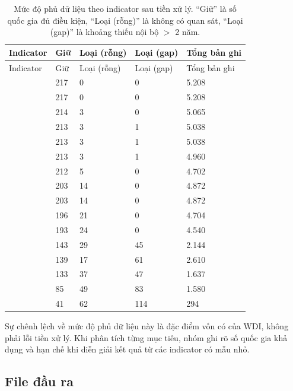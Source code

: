 \begin{longtable}{L{3.5cm}L{2.5cm}L{2cm}L{2cm}L{2.2cm}}
\caption{Mức độ phủ dữ liệu theo indicator sau tiền xử lý. ``Giữ'' là số quốc gia đủ điều kiện, ``Loại (rỗng)'' là không có quan sát, ``Loại (gap)'' là khoảng thiếu nội bộ $>$ 2 năm.}
\label{tab:indicator-coverage}\\
\toprule
Indicator & Giữ & Loại (rỗng) & Loại (gap) & Tổng bản ghi \\
\midrule
\endfirsthead
\toprule
Indicator & Giữ & Loại (rỗng) & Loại (gap) & Tổng bản ghi \\
\midrule
\endhead

 & 217 & 0 & 0 & 5.208 \\
 & 217 & 0 & 0 & 5.208 \\
 & 214 & 3 & 0 & 5.065 \\
 & 213 & 3 & 1 & 5.038 \\
 & 213 & 3 & 1 & 5.038 \\
 & 213 & 3 & 1 & 4.960 \\
 & 212 & 5 & 0 & 4.702 \\
 & 203 & 14 & 0 & 4.872 \\
 & 203 & 14 & 0 & 4.872 \\
 & 196 & 21 & 0 & 4.704 \\
 & 193 & 24 & 0 & 4.540 \\
 & 143 & 29 & 45 & 2.144 \\
 & 139 & 17 & 61 & 2.610 \\
 & 133 & 37 & 47 & 1.637 \\
 & 85 & 49 & 83 & 1.580 \\
 & 41 & 62 & 114 & 294 \\
\bottomrule
\end{longtable}

Sự chênh lệch về mức độ phủ dữ liệu này là đặc điểm vốn có của WDI, không phải lỗi tiền xử lý. Khi phân tích từng mục tiêu, nhóm ghi rõ số quốc gia khả dụng và hạn chế khi diễn giải kết quả từ các indicator có mẫu nhỏ.

\subsection{File đầu ra}

